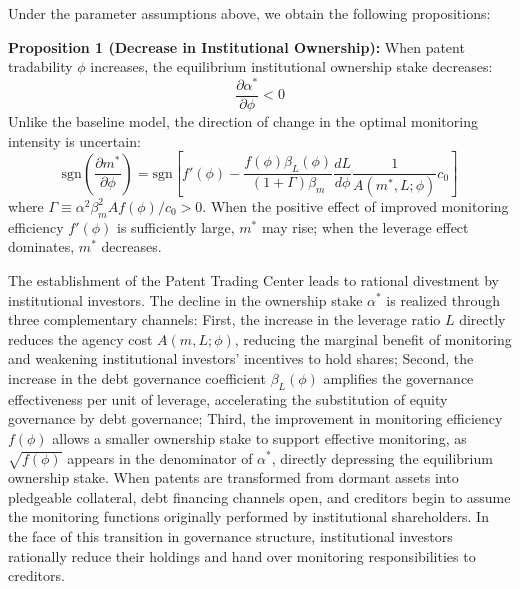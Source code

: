 \documentclass[12pt,a4paper]{article}
\begin{document}
Under the parameter assumptions above, we obtain the following propositions:

\textbf{Proposition 1 (Decrease in Institutional Ownership):} When patent tradability $\phi$ increases, the equilibrium institutional ownership stake decreases:
\begin{equation}
\frac{\partial \alpha^*}{\partial \phi} < 0
\end{equation}
Unlike the baseline model, the direction of change in the optimal monitoring intensity is uncertain:
\begin{equation}
\text{sgn} \left( \frac{\partial m^*}{\partial \phi} \right) = \text{sgn} \left[ f'(\phi) - \frac{f(\phi) \beta_L(\phi)}{(1 + \Gamma) \beta_m} \frac{dL}{d\phi} \frac{1}{A(m^*, L; \phi)} c_0 \right]
\end{equation}
where $\Gamma \equiv \alpha^2 \beta_m^2 A f(\phi) / c_0 > 0$. When the positive effect of improved monitoring efficiency $f'(\phi)$ is sufficiently large, $m^*$ may rise; when the leverage effect dominates, $m^*$ decreases.

The establishment of the Patent Trading Center leads to rational divestment by institutional investors. The decline in the ownership stake $\alpha^*$ is realized through three complementary channels: First, the increase in the leverage ratio $L$ directly reduces the agency cost $A(m, L; \phi)$, reducing the marginal benefit of monitoring and weakening institutional investors' incentives to hold shares; Second, the increase in the debt governance coefficient $\beta_L(\phi)$ amplifies the governance effectiveness per unit of leverage, accelerating the substitution of equity governance by debt governance; Third, the improvement in monitoring efficiency $f(\phi)$ allows a smaller ownership stake to support effective monitoring, as $\sqrt{f(\phi)}$ appears in the denominator of $\alpha^*$, directly depressing the equilibrium ownership stake. When patents are transformed from dormant assets into pledgeable collateral, debt financing channels open, and creditors begin to assume the monitoring functions originally performed by institutional shareholders. In the face of this transition in governance structure, institutional investors rationally reduce their holdings and hand over monitoring responsibilities to creditors.
\end{document}
